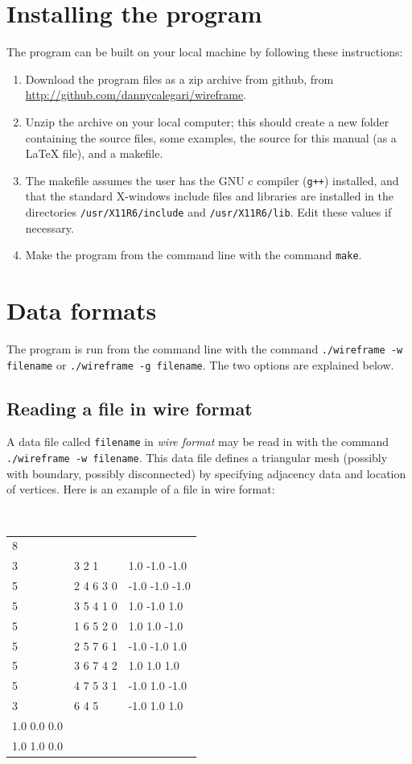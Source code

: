 \documentclass[12pt]{article}
\begin{document}
\section{Installing the program}\label{section:installation}

The program can be built on your local machine by following these instructions:

\begin{enumerate}
\item{Download the program files as a zip archive from github, from 
\url{http://github.com/dannycalegari/wireframe}.}
\item{Unzip the archive on your local computer; this should create a new folder containing
the source files, some examples, the source for this manual (as a LaTeX file), and a
makefile.}
\item{The makefile assumes the user has the GNU c compiler ({\tt g++}) installed, and that the standard
X-windows include files and libraries are installed in the directories {\tt /usr/X11R6/include}
and {\tt /usr/X11R6/lib}. Edit these values if necessary.}
\item{Make the program from the command line with the command {\tt make}.}
\end{enumerate}


\section{Data formats}\label{section:data_format}

The program is run from the command line with the command {\tt ./wireframe -w filename}
or {\tt ./wireframe -g filename}. The two options are explained below.

\subsection{Reading a file in wire format}

A data file called {\tt filename} in {\em wire format} may be read in with the command 
{\tt ./wireframe -w filename}. This data file defines a triangular mesh (possibly with
boundary, possibly disconnected) by specifying adjacency data and location of vertices. 
Here is an example of a file in wire format:

\begin{center}
{\tt
\begin{tabular}{lll}
8 & & \\
3 & 3 2 1 &	1.0 -1.0 -1.0 \\
5 & 2 4 6 3 0 & -1.0 -1.0 -1.0 \\
5 & 3 5 4 1 0 & 1.0 -1.0 1.0 \\
5 & 1 6 5 2 0 & 1.0 1.0 -1.0 \\
5 & 2 5 7 6 1 & -1.0 -1.0 1.0 \\
5 & 3 6 7 4 2 & 1.0 1.0 1.0 \\
5 & 4 7 5 3 1 & -1.0 1.0 -1.0 \\
3 & 6 4 5 & -1.0 1.0 1.0 \\
1.0 0.0 0.0 & & \\
1.0 1.0 0.0 & &
\end{tabular}
}
\end{center}
\end{document}
